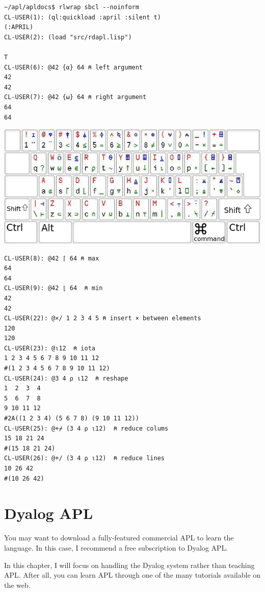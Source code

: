 \documentclass[a4paper,12pt]{book}
\begin{document}
\begin{lstlisting}[language=apl]
~/apl/apldocs$ rlwrap sbcl --noinform
CL-USER(1): (ql:quickload :april :silent t)
(:APRIL)
CL-USER(2): (load "src/rdapl.lisp")

T
CL-USER(6): @42 {⍺} 64 ⍝ left argument
42
42
CL-USER(7): @42 {⍵} 64 ⍝ right argument
64
64
\end{lstlisting}

\noindent
\includegraphics{figs/aplkb-largekeys.jpg}

\begin{lstlisting}[language=apl]
CL-USER(8): @42 ⌈ 64 ⍝ max
64
64
CL-USER(9): @42 ⌊ 64  ⍝ min
42
42
CL-USER(22): @×/ 1 2 3 4 5 ⍝ insert × between elements
120
120
CL-USER(23): @⍳12  ⍝ iota
1 2 3 4 5 6 7 8 9 10 11 12
#(1 2 3 4 5 6 7 8 9 10 11 12)
CL-USER(24): @3 4 ⍴ ⍳12  ⍝ reshape
1  2  3  4
5  6  7  8
9 10 11 12
#2A((1 2 3 4) (5 6 7 8) (9 10 11 12))
CL-USER(25): @+⌿ (3 4 ⍴ ⍳12)  ⍝ reduce colums
15 18 21 24
#(15 18 21 24)
CL-USER(26): @+/ (3 4 ⍴ ⍳12)  ⍝ reduce lines
10 26 42
#(10 26 42)
\end{lstlisting}


\chapter{Dyalog APL}\large
You may want to download a fully-featured commercial
APL to learn the language. In this case, I recommend
a free subscription to Dyalog APL.

In this chapter, I will focus on handling the
Dyalog system rather than teaching APL.
After all, you can learn APL through one
of the many tutorials available on the web.
\end{document}

